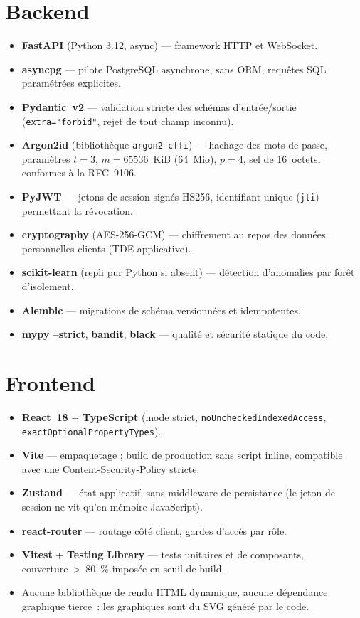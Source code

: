 \documentclass[11pt,a4paper]{report}
\begin{document}
\section{Backend}
\begin{itemize}
  \item \textbf{FastAPI} (Python 3.12, async) --- framework HTTP et WebSocket.
  \item \textbf{asyncpg} --- pilote PostgreSQL asynchrone, sans ORM, requêtes
    SQL paramétrées explicites.
  \item \textbf{Pydantic~v2} --- validation stricte des schémas d'entrée/sortie
    (\texttt{extra="forbid"}, rejet de tout champ inconnu).
  \item \textbf{Argon2id} (bibliothèque \texttt{argon2-cffi}) --- hachage des
    mots de passe, paramètres $t=3$, $m=65536$~KiB (64~Mio), $p=4$, sel de
    16~octets, conformes à la RFC~9106.
  \item \textbf{PyJWT} --- jetons de session signés HS256, identifiant unique
    (\texttt{jti}) permettant la révocation.
  \item \textbf{cryptography} (AES-256-GCM) --- chiffrement au repos des
    données personnelles clients (TDE applicative).
  \item \textbf{scikit-learn} (repli pur Python si absent) --- détection
    d'anomalies par forêt d'isolement.
  \item \textbf{Alembic} --- migrations de schéma versionnées et idempotentes.
  \item \textbf{mypy --strict}, \textbf{bandit}, \textbf{black} --- qualité et
    sécurité statique du code.
\end{itemize}

\section{Frontend}
\begin{itemize}
  \item \textbf{React~18} + \textbf{TypeScript} (mode strict,
    \texttt{noUncheckedIndexedAccess}, \texttt{exactOptionalPropertyTypes}).
  \item \textbf{Vite} --- empaquetage ; build de production sans script
    inline, compatible avec une Content-Security-Policy stricte.
  \item \textbf{Zustand} --- état applicatif, sans middleware de persistance
    (le jeton de session ne vit qu'en mémoire JavaScript).
  \item \textbf{react-router} --- routage côté client, gardes d'accès par
    rôle.
  \item \textbf{Vitest} + \textbf{Testing Library} --- tests unitaires et de
    composants, couverture~\textgreater{}~80~\% imposée en seuil de build.
  \item Aucune bibliothèque de rendu HTML dynamique, aucune dépendance
    graphique tierce~: les graphiques sont du SVG généré par le code.
\end{itemize}
\end{document}
